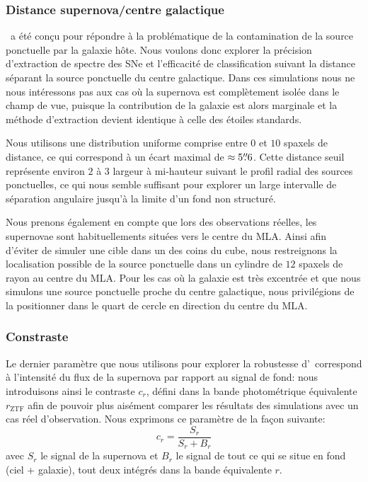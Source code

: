 \documentclass[../main/main.tex]{subfiles}
\begin{document}
\subsubsection{Distance supernova/centre galactique}\label{fig::distancesimu}

\hypergal\ a été conçu pour répondre à la problématique de la
contamination de la source ponctuelle par la galaxie hôte. Nous voulons donc explorer la
précision d'extraction de spectre des SNe et l'efficacité de
classification suivant la distance séparant la source ponctuelle du
centre galactique. Dans ces simulations nous ne nous intéressons pas aux
cas où la supernova est complètement isolée dans le champ de vue,
puisque la contribution de la galaxie est alors marginale et
la méthode d'extraction devient identique à celle des étoiles standards.

Nous utilisons une distribution uniforme comprise entre $0$ et $10$
spaxels de distance, ce qui correspond à un écart maximal de
$\approx5\overset{\prime\prime}{.}6$. Cette distance seuil représente environ $2$ à $3$ largeur à
mi-hauteur suivant le profil radial des sources ponctuelles, ce qui nous
semble suffisant pour explorer un large intervalle de séparation
angulaire jusqu'à la limite d'un fond non structuré. 

Nous prenons également en compte que lors des observations réelles, les
supernovae sont habituellements situées vers le centre du MLA. Ainsi
afin d'éviter de simuler une cible dans un des coins du cube, nous
restreignons la localisation possible de la source ponctuelle dans un
cylindre de $12$ spaxels de rayon au centre du MLA. Pour les cas où la
galaxie est très excentrée et que nous simulons une source ponctuelle
proche du centre galactique, nous privilégions de la positionner dans le
quart de cercle en direction du centre du MLA. 

\subsubsection{Constraste}

Le dernier paramètre que nous utilisons pour explorer la robustesse
d'\hypergal\ correspond à l'intensité du flux de la supernova par
rapport au signal de fond: nous introduisons ainsi le
contraste $c_{r}$, défini dans la bande photométrique équivalente $r_{\text{ZTF}}$
afin de pouvoir plus aisément comparer les résultats des simulations
avec un cas réel d'observation. Nous exprimons ce paramètre de la façon suivante:
\begin{equation}
  \label{eq:contrast}
  c_{r} = \frac{S_{r}}{S_{r}+B_{r}}
\end{equation}
avec $S_{r}$ le signal de la supernova et $B_{r}$ le signal de tout ce qui se
situe en fond (ciel + galaxie), tout deux intégrés dans la bande
équivalente $r$.
\end{document}
